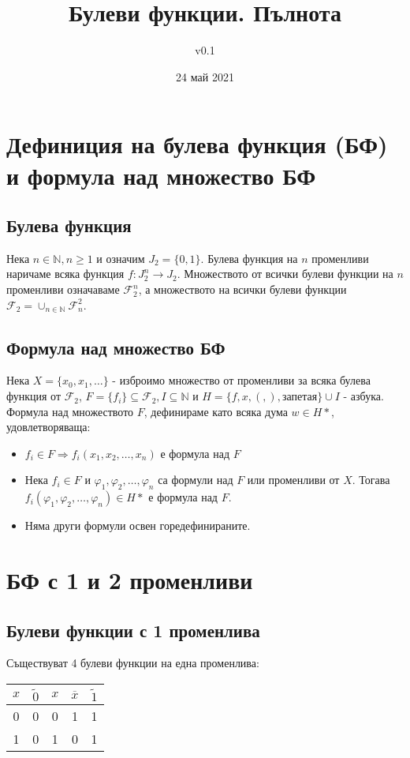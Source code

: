 \documentclass[fleqn,12pt]{article}
\title{Булеви функции. Пълнота}
\author{v0.1}
\date{24 май 2021}
\begin{document}
\maketitle

\tableofcontents

\begin{flushleft}

\section{Дефиниция на булева функция (БФ) и формула над множество БФ}

\subsection{Булева функция}
Нека $n \in \mathbb{N}, n \geq 1$ и означим $J_2 = \{ 0, 1 \}$. 
Булева функция на $n$ променливи наричаме всяка функция $f : J_2^n \rightarrow J_2$.
Множеството от всички булеви функции на $n$ променливи означаваме
$\mathcal{F}_2^n$, а множеството на всички булеви функции $\mathcal{F}_2 = \cup_{n \in \mathbb{N}} \mathcal{F}^2_n$.

\subsection{Формула над множество БФ}
Нека $X = \{ x_0, x_1, \dots \}$ - изброимо множество от променливи за
всяка булева функция от $\mathcal{F}_2$, $F = \{ f_i \} \subseteq \mathcal{F}_2, I \subseteq \mathbb{N}$
и $H = \{ f, x, (, ), \text{запетая}  \} \cup I $ - азбука.
Формула над множеството $F$, дефинираме като всяка дума $w \in H*$, удовлетворяваща:
\begin{itemize}
    \item $f_i \in F \Rightarrow f_i(x_1,x_2,\dots,x_n)$ е формула над $F$
    \item Нека $f_i \in F$ и $\varphi_1, \varphi_2, \dots, \varphi_n$ са формули над $F$ или променливи от $X$.
    Тогава $f_i(\varphi_1, \varphi_2, \dots, \varphi_n) \in H*$ е формула над $F$.
    \item Няма други формули освен горедефинираните.
\end{itemize}

\section{БФ с 1 и 2 променливи}

\subsection{Булеви функции с 1 променлива}
Съществуват 4 булеви функции на една променлива:
\begin{center}
\begin{tabular}{ |c|c|c|c|c| } 
    \hline
    $x$ & $\widetilde{0}$ & $x$ & $\overline{x}$ & $\widetilde{1}$ \\ 
    \hline
    0 & 0 & 0 & 1 & 1 \\ 
    1 & 0 & 1 & 0 & 1 \\ 
    \hline
\end{tabular}
\end{center}


\end{flushleft}
\end{document}
